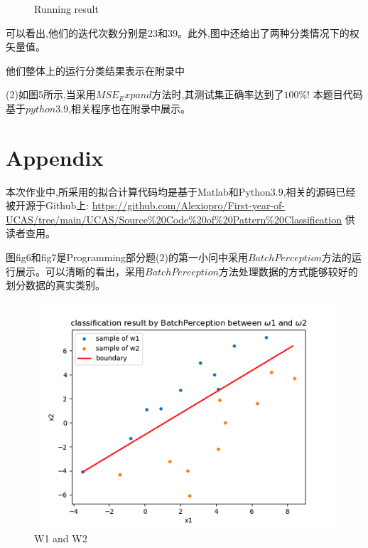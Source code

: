 \documentclass[homework]{IEEEtran}
\begin{document}
\begin{CJK}{UTF8}{gkai}
\begin{enumerate}[]
\begin{figure}[htb]
            \caption{Running result}
            \label{fig}
        \end{figure}  \par
        可以看出,他们的迭代次数分别是23和39。此外,图中还给出了两种分类情况下的权矢量值。 \par
        他们整体上的运行分类结果表示在附录中 \par
        (2)如图5所示,当采用$MSE_Expand$方法时,其测试集正确率达到了$100\%$!
        本题目代码基于$python3.9$,相关程序也在附录中展示。
    	\end{enumerate}\par
\end{CJK}

\section{Appendix}
\begin{CJK}{UTF8}{gkai}
    本次作业中,所采用的拟合计算代码均是基于Matlab和Python3.9,相关的源码已经被开源于Github上:
    \url{https://github.com/Alexiopro/First-year-of-UCAS/tree/main/UCAS/Source%20Code%20of%20Pattern%20Classification}
    供读者查用。 \par
    图fig6和fig7是Programming部分题(2)的第一小问中采用$Batch Perception$方法的运行展示。可以清晰的看出，采用$Batch Perception$方法处理数据的方式能够较好的划分数据的真实类别。
\end{CJK}
\begin{figure}[htb]
    \centerline{\includegraphics{Images/BP12.png}}
    \caption{W1 and W2 }
    \label{fig}
\end{figure}
\end{document}

